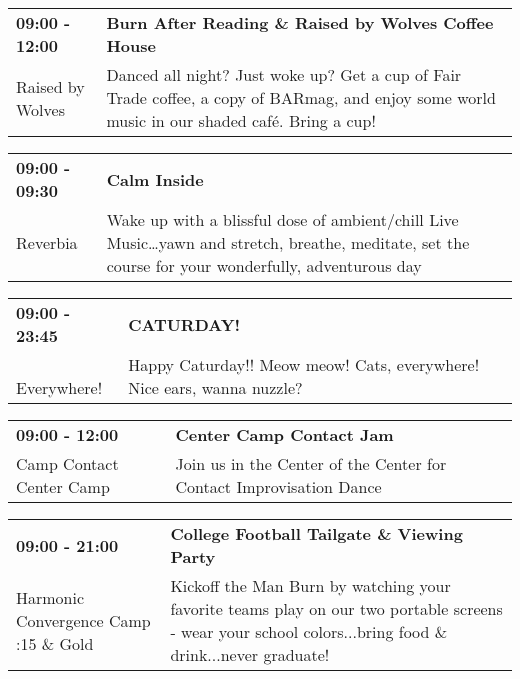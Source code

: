 \begin{tabular}{ p{1in} p{2.2in} }
    \textbf{09:00 - 12:00} & \textbf{Burn After Reading \& Raised by Wolves Coffee House} \\
    Raised by Wolves \newline  & Danced all night? Just woke up? Get a cup of Fair Trade coffee, a copy of BARmag, and enjoy some world music in our shaded caf\'e. Bring a cup! \\
    \hline 
\end{tabular}
    
\begin{tabular}{ p{1in} p{2.2in} }
    \textbf{09:00 - 09:30} & \textbf{Calm Inside} \\
    Reverbia \newline  & Wake up with a blissful dose of ambient/chill Live Music\ldots yawn and stretch, breathe, meditate, set the course for your wonderfully, adventurous day \\
    \hline 
\end{tabular}
    
\begin{tabular}{ p{1in} p{2.2in} }
    \textbf{09:00 - 23:45} & \textbf{CATURDAY!} \\
    ~ \newline Everywhere! & Happy Caturday!! Meow meow! Cats, everywhere! Nice ears, wanna nuzzle? \\
    \hline 
\end{tabular}
    
\begin{tabular}{ p{1in} p{2.2in} }
    \textbf{09:00 - 12:00} & \textbf{Center Camp Contact Jam} \\
    Camp Contact \newline Center Camp & Join us in the Center of the Center for Contact Improvisation Dance \\
    \hline 
\end{tabular}
    
\begin{tabular}{ p{1in} p{2.2in} }
    \textbf{09:00 - 21:00} & \textbf{College Football Tailgate \& Viewing Party} \\
    Harmonic Convergence Camp \newline 4:15 \& Gold & Kickoff the Man Burn by watching your favorite teams play on our two portable screens - wear your school colors...bring food \& drink...never graduate! \\
    \hline 
\end{tabular}
    
